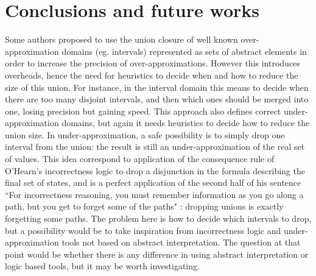 \chapter{Conclusions and future works}

Some authors proposed  to use the union closure of well known over-approximation domains (eg. intervals) represented as sets of abstract elements in order to increase the precision of over-approximations. However this introduces overheads, hence the need for heuristics to decide when and how to reduce the size of this union. For instance, in the interval domain this means to decide when there are too many disjoint intervals, and then which ones should be merged into one, losing precision but gaining speed.
This approach also defines correct under-approximation domains, but again it needs heuristics to decide how to reduce the union size. In under-approximation, a safe possibility is to simply drop one interval from the union: the result is still an under-approximation of the real set of values. This idea correspond to application of the consequence rule of O'Hearn's incorrectness logic to drop a disjunction in the formula describing the final set of states, and is a perfect application of the second half of his sentence ``For incorrectness reasoning, you must remember information as you go along a path, but you get to forget some of the paths" \cite{ohearn-incorrectness-logic}: dropping unions is exactly forgetting some paths.
The problem here is how to decide which intervals to drop, but a possibility would be to take inspiration from incorrectness logic and under-approximation tools not based on abstract interpretation. The question at that point would be whether there is any difference in using abstract interpretation or logic based tools, but it may be worth investigating.
